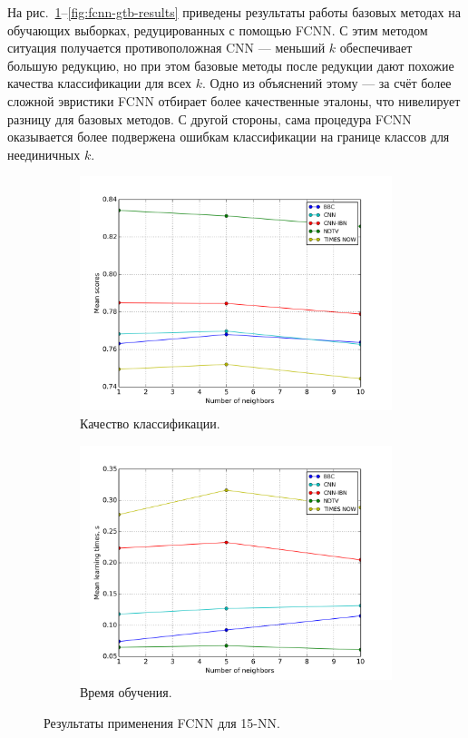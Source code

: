 На рис.~\ref{fig:fcnn-knn-results}--\ref{fig:fcnn-gtb-results} приведены результаты работы базовых методах на обучающих выборках, редуцированных с помощью FCNN. С этим методом ситуация получается противоположная CNN --- меньший \(k\) обеспечивает большую редукцию, но при этом базовые методы после редукции дают похожие качества классификации для всех \(k\). Одно из объяснений этому --- за счёт более сложной эвристики FCNN отбирает более качественные эталоны, что нивелирует разницу для базовых методов. С другой стороны, сама процедура FCNN оказывается более подвержена ошибкам классификации на границе классов для неединичных \(k\).

\begin{figure}[h!]
    \centering
	\begin{subfigure}{0.45\textwidth}
		\includegraphics[width=\textwidth]{images/fcnn-KNN.png}
		\caption{Качество классификации.}
	\end{subfigure}
	\begin{subfigure}{0.45\textwidth}
		\includegraphics[width=\textwidth]{images/fcnn-KNNTime.png}
		\caption{Время обучения.}
	\end{subfigure}
	\caption{Результаты применения FCNN для 15-NN.}\label{fig:fcnn-knn-results}
\end{figure}

